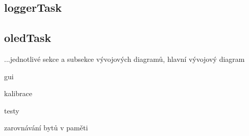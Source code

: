 \subsection{loggerTask}
\subsection{oledTask}

...jednotlivé sekce a subsekce vývojových diagramů, hlavní vývojový diagram

gui

kalibrace

testy

zarovnávání bytů v paměti



